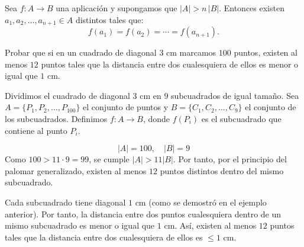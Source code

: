 \documentclass[a4paper,12pt]{article}
\begin{document}
\begin{procedimiento}
Sea $f : A \to B$ una aplicación y supongamos que $|A| > n \, |B|$. Entonces existen $a_1, a_2, \dots, a_{n+1} \in A$ distintos tales que:
\[
f(a_1) = f(a_2) = \cdots = f(a_{n+1}).
\]
\end{procedimiento}

\begin{ejemplo}[title=Ejemplo: Puntos en un cuadrado]
Probar que si en un cuadrado de diagonal $3$ cm marcamos $100$ puntos, existen al menos $12$ puntos tales que la distancia entre dos cualesquiera de ellos es menor o igual que $1$ cm.

\vspace{5pt}

Dividimos el cuadrado de diagonal $3$ cm en $9$ subcuadrados de igual tamaño.  
Sea $A = \{P_1, P_2, \dots, P_{100}\}$ el conjunto de puntos y $B = \{C_1, C_2, \dots, C_9\}$ el conjunto de los subcuadrados.  
Definimos $f : A \to B$, donde $f(P_i)$ es el subcuadrado que contiene al punto $P_i$.

\[
|A| = 100, \quad |B| = 9
\]
Como $100 > 11 \cdot 9 = 99$, se cumple $|A| > 11|B|$.  
Por tanto, por el principio del palomar generalizado, existen al menos $12$ puntos distintos dentro del mismo subcuadrado.

\vspace{0.5em}

Cada subcuadrado tiene diagonal $1$ cm (como se demostró en el ejemplo anterior).  
Por tanto, la distancia entre dos puntos cualesquiera dentro de un mismo subcuadrado es menor o igual que $1$ cm.  
Así, existen al menos $12$ puntos tales que la distancia entre dos cualesquiera de ellos es $\leq 1$ cm.

\begin{center}
\end{center}

\end{ejemplo}
\end{document}
